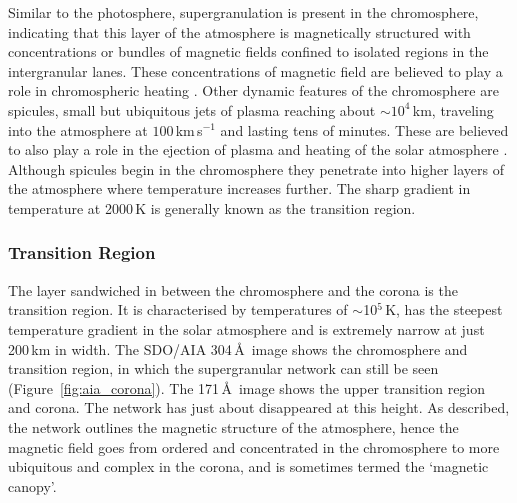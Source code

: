 Similar to the photosphere, supergranulation is present in the chromosphere, indicating that this layer of the atmosphere is magnetically structured with concentrations or bundles of magnetic fields confined to isolated regions in the intergranular lanes. These concentrations of magnetic field are believed to play a role in chromospheric heating \citep{carlsson1997}. Other dynamic features of the chromosphere are spicules, small but ubiquitous jets of plasma reaching about $\sim$$10^4$\,km, traveling into the atmosphere at $100$\,km\,s$^{-1}$ and lasting tens of minutes. These are believed to also play a role in the ejection of plasma and heating of the solar atmosphere \citep{depont2004}. Although spicules begin in the chromosphere they penetrate into higher layers of the atmosphere where temperature increases further.
The sharp gradient in temperature at 2000\,K is generally known as the transition region. 

\subsubsection{Transition Region}
The layer sandwiched in between the chromosphere and the corona is the transition region. It is characterised by temperatures of $\sim$10$^{5}$\,K, has the steepest temperature gradient in the solar atmosphere and is extremely narrow at just 200\,km in width. The SDO/AIA 304\,\AA~image shows the chromosphere and transition region, in which the supergranular network can still be seen (Figure~\ref{fig:aia_corona}). The 171\,\AA~image shows the upper transition region and corona. The network has just about disappeared at this height. As described, the network outlines the magnetic structure of the atmosphere, hence the magnetic field goes from ordered and concentrated in the chromosphere to more ubiquitous and complex in the corona, and is sometimes termed the `magnetic canopy'.


